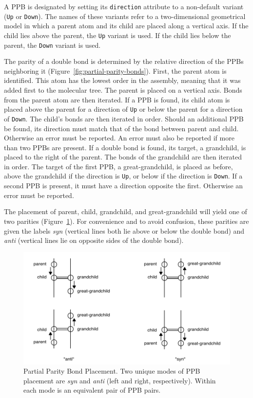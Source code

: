 \documentclass{article}
\def\ttt{\texttt}
\begin{document}
A PPB is designated by setting its \ttt{direction} attribute to a non-default variant (\ttt{Up} or \ttt{Down}). The names of these variants refer to a two-dimensional geometrical model in which a parent atom and its child are placed along a vertical axis. If the child lies above the parent, the \ttt{Up} variant is used. If the child lies below the parent, the \ttt{Down} variant is used.

The parity of a double bond is determined by the relative direction of the PPBs neighboring it (Figure~\ref{fig:partial-parity-bonds}). First, the parent atom is identified. This atom has the lowest order in the assembly, meaning that it was added first to the molecular tree. The parent is placed on a vertical axis. Bonds from the parent atom are then iterated. If a PPB is found, its child atom is placed above the parent for a direction of \ttt{Up} or below the parent for a direction of \ttt{Down}. The child's bonds are then iterated in order. Should an additional PPB be found, its direction must match that of the bond between parent and child. Otherwise an error must be reported. An error must also be reported if more than two PPBs are present. If a double bond is found, its target, a grandchild, is placed to the right of the parent. The bonds of the grandchild are then iterated in order. The target of the first PPB, a great-grandchild, is placed as before, above the grandchild if the direction is \ttt{Up}, or below if the direction is \ttt{Down}. If a second PPB is present, it must have a direction opposite the first. Otherwise an error must be reported.

The placement of parent, child, grandchild, and great-grandchild will yield one of two parities (Figure~\ref{fig:ppb-placement}). For convenience and to avoid confusion, these parities are given the labels  \textit{syn} (vertical lines both lie above or below the double bond) and \textit{anti} (vertical lines lie on opposite sides of the double bond).

\begin{figure}
    \centering
    \includegraphics[width=\columnwidth]{partial-parity-bond-placement.pdf}
    \caption{Partial Parity Bond Placement. Two unique modes of PPB placement are \textit{syn} and \textit{anti} (left and right, respectively). Within each mode is an equivalent pair of PPB pairs.}
    \label{fig:ppb-placement}
\end{figure}
\end{document}
